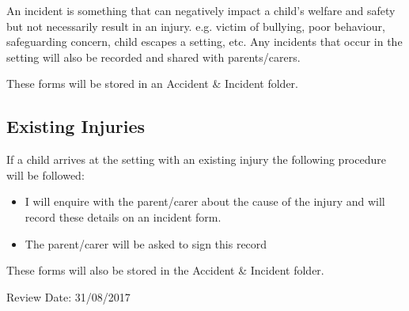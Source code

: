 An incident is something that can negatively impact a child's welfare and
safety but not necessarily result in an injury. e.g. victim of bullying, 
poor behaviour, safeguarding concern, child escapes a setting, etc.
Any incidents that occur in the setting will also be recorded and shared with
parents/carers.

These forms will be stored in an Accident \& Incident folder.

\subsection{Existing Injuries}

If a child arrives at the setting with an existing injury the following
procedure will be followed:

\begin{itemize}
\item
  I will enquire with the parent/carer about the cause of the injury
  and will record these details on an incident form.~
\item
  The parent/carer will be asked to sign this record~
\end{itemize}

These forms will also be stored in the Accident \& Incident folder.

Review Date: 31/08/2017


